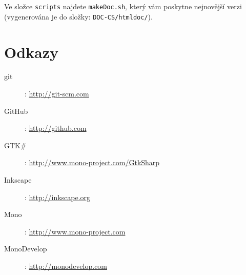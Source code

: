\documentclass[a4paper]{article}
\begin{document}
Ve složce \texttt{scripts} najdete \texttt{makeDoc.sh}, který vám poskytne nejnovější verzi (vygenerována je do složky: \texttt{DOC-CS/htmldoc/}). 

\section{Odkazy}
\begin{description}
\item[git]: \href{http://git-scm.com}{http://git-scm.com}
\item[GitHub]: \href{http://github.com}{http://github.com}
\item[GTK\#]: \href{http://www.mono-project.com/GtkSharp}{http://www.mono-project.com/GtkSharp}
\item[Inkscape]: \href{http://inkscape.org}{http://inkscape.org}
\item[Mono]: \href{http://www.mono-project.com}{http://www.mono-project.com}
\item[MonoDevelop]: \href{http://monodevelop.com}{http://monodevelop.com}
\end{description}
\end{document}
